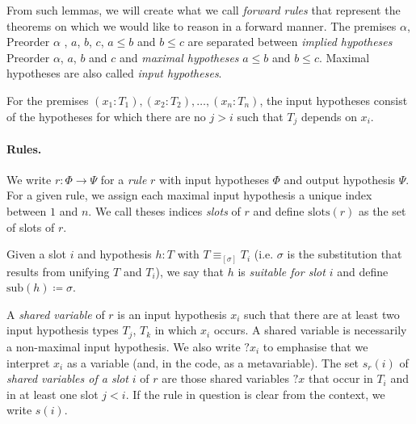 \documentclass[runningheads]{llncs}
\begin{document}
From such lemmas, we will create what we call \textit{forward rules} that represent
the theorems on which we would like to reason in a forward manner.
The premises $\alpha$, $ \text{Preorder } \alpha$ , $a$, $b$, $c$, $a \leq b$ and
$b \leq c$ are separated between \textit{implied hypotheses} $\text{Preorder } \alpha$,
$a$, $b$ and $c$ and \textit{maximal hypotheses} $a \leq b$ and $b \leq c$.
Maximal hypotheses are also called \textit{input hypotheses}.

For the premises $(x_1 : T_1),(x_2 : T_2),\dots,(x_n : T_n)$,
the input hypotheses consist of the hypotheses for which there are no
$j > i$ such that $T_j$ depends on $x_i$.

\paragraph{Rules.}
We write $r : \Phi \to \Psi$ for a \textit{rule} $r$ with input
hypotheses $\Phi$ and output hypothesis $\Psi$.
For a given rule, we assign each maximal input hypothesis a unique index
between $1$ and $n$.
We call theses indices \textit{slots} of $r$ and define $\text{slots}(r)$ as
the set of slots of $r$.

Given a slot $i$ and hypothesis $h : T$ with $T \equiv_{[\sigma]} T_i$
(i.e. $\sigma$ is the substitution that results from unifying $T$ and $T_i$), 
we say that $h$ is \textit{suitable for slot $i$} and define $\text{sub}(h) ≔ \sigma$.

A \textit{shared variable} of $r$ is an input hypothesis $x_i$ such that there are
at least two input hypothesis types $T_j$, $T_k$ in which $x_i$ occurs.
A shared variable is necessarily a non-maximal input hypothesis.
We also write $?x_i$ to emphasise that we interpret $x_i$ as a variable
(and, in the code, as a metavariable).
The set $s_r(i)$ of \textit{shared variables of a slot} $i$ of $r$ are those
shared variables $?x$ that occur in $T_i$ and in at least one slot $j < i$.
If the rule in question is clear from the context, we write $s(i)$.
 

\end{document}
